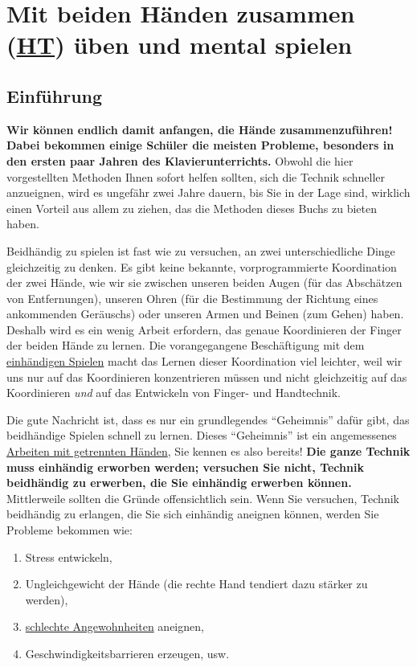 
\section{Mit beiden Händen zusammen (\hyperref[HsHt]{HT}) üben und mental spielen}
\label{c1ii25}


\subsection{Einführung}
\label{c1ii25a}

\textbf{Wir können endlich damit anfangen, die Hände zusammenzuführen!
Dabei bekommen einige Schüler die meisten Probleme, besonders in den ersten paar Jahren des Klavierunterrichts.}
Obwohl die hier vorgestellten Methoden Ihnen sofort helfen sollten, sich die Technik schneller anzueignen, wird es ungefähr zwei Jahre dauern, bis Sie in der Lage sind, wirklich einen Vorteil aus allem zu ziehen, das die Methoden dieses Buchs zu bieten haben.

Beidhändig zu spielen ist fast wie zu versuchen, an zwei unterschiedliche Dinge gleichzeitig zu denken.
Es gibt keine bekannte, vorprogrammierte Koordination der zwei Hände, wie wir sie zwischen unseren beiden Augen (für das Abschätzen von Entfernungen), unseren Ohren (für die Bestimmung der Richtung eines ankommenden Geräuschs) oder unseren Armen und Beinen (zum Gehen) haben.
Deshalb wird es ein wenig Arbeit erfordern, das genaue Koordinieren der Finger der beiden Hände zu lernen.
Die vorangegangene Beschäftigung mit dem \hyperref[c1ii7]{einhändigen Spielen} macht das Lernen dieser Koordination viel leichter, weil wir uns nur auf das Koordinieren konzentrieren müssen und nicht gleichzeitig auf das Koordinieren \textit{und} auf das Entwickeln von Finger- und Handtechnik.

Die gute Nachricht ist, dass es nur ein grundlegendes \enquote{Geheimnis} dafür gibt, das beidhändige Spielen schnell zu lernen.
Dieses \enquote{Geheimnis} ist ein angemessenes \hyperref[c1ii7]{Arbeiten mit getrennten Händen}, Sie kennen es also bereits!
\textbf{Die ganze Technik muss einhändig erworben werden;
versuchen Sie nicht, Technik beidhändig zu erwerben, die Sie einhändig erwerben können.}
Mittlerweile sollten die Gründe offensichtlich sein.
Wenn Sie versuchen, Technik beidhändig zu erlangen, die Sie sich einhändig aneignen können, werden Sie Probleme bekommen wie:

\begin{enumerate}[label={\arabic*.}] 
 \item Stress entwickeln,
 \item Ungleichgewicht der Hände (die rechte Hand tendiert dazu stärker zu werden),
 \item \hyperref[c1ii22]{schlechte Angewohnheiten} aneignen,
 \item Geschwindigkeitsbarrieren erzeugen, usw.
 \end{enumerate}

